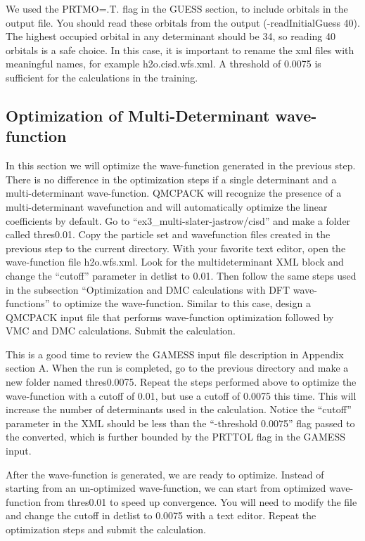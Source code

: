We used the PRTMO=.T. flag in the GUESS section, to include orbitals in the output file. You should read these orbitals from the output (-readInitialGuess 40).
The highest occupied orbital in any determinant should be 34, so reading 40 orbitals is a safe choice. In this case, it is important to rename the xml files with meaningful names, for example h2o.cisd.wfs.xml. A threshold of 0.0075 is sufficient for the calculations in the training.


\subsection{Optimization of Multi-Determinant wave-function}

In this section we will optimize the wave-function generated in the previous step. There
is no difference in the optimization steps if a single determinant and a multi-determinant wave-function.
QMCPACK will recognize the presence of a multi-determinant wavefunction and will automatically 
optimize the linear coefficients by default. Go to ``ex3\_multi-slater-jastrow/cisd'' and make a folder called 
thres0.01. Copy the particle set and wavefunction files created in the previous step to the current 
directory. With your favorite text editor, open the wave-function file h2o.wfs.xml. Look for 
the multideterminant XML block and change the ``cutoff'' parameter in detlist to 0.01. Then follow 
the same steps used in the subsection ``Optimization and DMC calculations with DFT wave-functions''
to optimize the wave-function. Similar to this case, design a QMCPACK input file that performs
wave-function optimization followed by VMC and DMC calculations. Submit the calculation.

This is a good time to review the GAMESS input file description in Appendix section A. 
When the run is completed, go to the previous directory and make a new folder named
thres0.0075. Repeat the steps performed above to optimize the wave-function with a cutoff of 0.01, but use a cutoff of 0.0075 this time. This will increase the number of determinants used in the calculation. Notice the ``cutoff'' parameter in the XML should be less than the ``-threshold 0.0075'' flag passed to the converted, which is further bounded by the PRTTOL flag in the GAMESS input.

After the wave-function is generated, we are ready to optimize. Instead of starting from an un-optimized wave-function, we can start from optimized wave-function from thres0.01 to speed up convergence. You will need to modify the file and change the cutoff in detlist to 0.0075 with a text editor. Repeat the optimization steps and submit the calculation.

